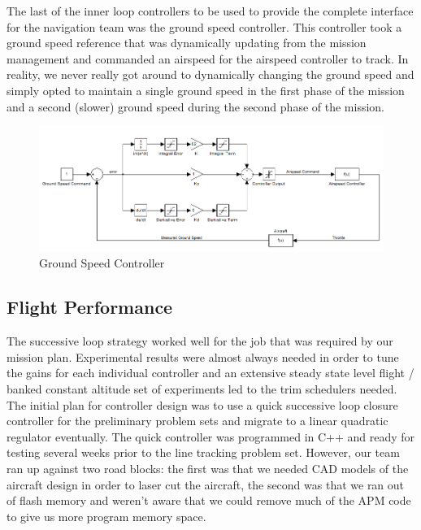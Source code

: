 \documentclass[11pt]{article}
\begin{document}
The last of the inner loop controllers to be used to provide the complete interface for the navigation team was the ground speed controller. This controller took a ground speed reference that was dynamically updating from the mission management and commanded an airspeed for the airspeed controller to track. In reality, we never really got around to dynamically changing the ground speed and simply opted to maintain a single ground speed in the first phase of the mission and a second (slower) ground speed during the second phase of the mission.

\begin{figure}[h!]
\centering
\includegraphics[width=\textwidth]{./Figures/GroundSpeedController}
\caption{Ground Speed Controller}
\label{fig:GroundSpeedController}
\end{figure}

\subsection{Flight Performance}
\label{CtrlFlightPerf}

The successive loop strategy worked well for the job that was required by our mission plan. Experimental results were almost always needed in order to tune the gains for each individual controller and an extensive steady state level flight / banked constant altitude set of experiments led to the trim schedulers needed. The initial plan for controller design was to use a quick successive loop closure controller for the preliminary problem sets and migrate to a linear quadratic regulator eventually. The quick controller was programmed in C++ and ready for testing several weeks prior to the line tracking problem set. However, our team ran up against two road blocks: the first was that we needed CAD models of the aircraft design in order to laser cut the aircraft, the second was that we ran out of flash memory and weren't aware that we could remove much of the APM code to give us more program memory space.
\end{document}
